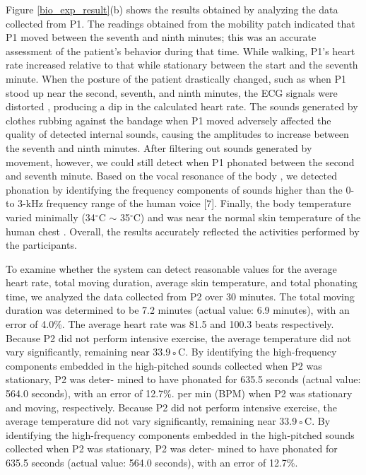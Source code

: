 Figure \ref{bio_exp_result}(b) shows the results obtained by analyzing the data collected from P1. The readings obtained from the mobility patch indicated that P1 moved between the seventh and ninth minutes; this was an accurate assessment of the patient's behavior during that time. While walking, P1's heart rate increased relative to that while stationary between the start and the seventh minute. When the posture of the patient drastically changed, such as when P1 stood up near the second, seventh, and ninth minutes, the ECG signals were distorted \cite{chan2013}, producing a dip in the calculated heart rate. The sounds generated by clothes rubbing against the bandage when P1 moved adversely affected the quality of detected internal sounds, causing the amplitudes to increase between the seventh and ninth minutes. After filtering out sounds generated by movement, however, we could still detect when P1 phonated between the second and seventh minute. Based on the vocal resonance of the body \cite{Dacre2002}, we detected phonation by identifying the frequency components of sounds higher than the 0- to 3-kHz frequency range of the human voice [7]. Finally, the body temperature varied minimally (34$^{\circ}$C $\sim$ 35$^{\circ}$C) and was near the normal skin temperature of the human chest \cite{Freitas1999}. Overall, the results accurately reflected the activities performed by the participants.

To examine whether the system can detect reasonable values for the average heart rate, total moving duration, average skin temperature, and total phonating time, we analyzed the data collected from P2 over 30 minutes. The total moving duration was determined to be 7.2 minutes (actual value: 6.9 minutes), with an error of 4.0\%. The average heart rate was 81.5 and 100.3 beats respectively.  Because P2 did not perform intensive exercise, the average temperature did not vary significantly, remaining near 33.9◦C. By identifying the high-frequency components embedded in the high-pitched sounds collected when P2 was stationary, P2 was deter- mined to have phonated for 635.5 seconds (actual value: 564.0 seconds), with an error of 12.7\%. per min (BPM) when P2 was stationary and moving, respectively.  Because P2 did not perform intensive exercise, the average temperature did not vary significantly, remaining near 33.9◦C. By identifying the high-frequency components embedded in the high-pitched sounds collected when P2 was stationary, P2 was deter- mined to have phonated for 635.5 seconds (actual value: 564.0 seconds), with an error of 12.7\%.

